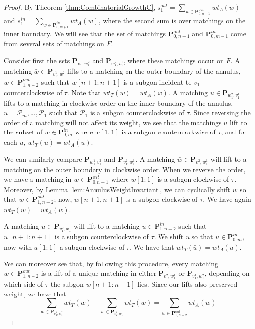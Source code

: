 \documentclass[12pt]{article}
\theoremstyle{remark}
\newcommand*{\pathset}[2]{\mathbf{P}_{#1,#2}}
\newcommand*{\poly}[1]{\mathcal{P}_{#1}}
\begin{document}
\begin{proof}
By Theorem \ref{thm:CombinatorialGrowthC}, $s_1^{out} = \sum_{w \in \pathset{0}{n+1}^{out}} wt_A(w)$ and $s_1^{in} = \sum_{w \in \pathset{0}{m+1}^{in}} wt_A(w)$, where the second sum is over matchings on the inner boundary. 
We will see that the set of matchings $\pathset{0}{n+1}^{out}$ and $\pathset{0}{m+1}^{in}$  come from several sets of matchings on $F$.

Consider first the sets $\pathset{v_1^1}{w_1^2}$ and $\pathset{w_1^2}{v_1^1}$, where these matchings occur on $F$. A matching $\bar{w} \in \pathset{v_1^1}{w_1^2}$ lifts to a matching on the outer boundary of the annulus, $w \in \pathset{1}{n+2}^{out}$ such that $w[n+1:n+1]$ is a subgon incident to $v_1$ counterclockwise of $\tau$. Note that $wt_T(\bar{w}) = wt_A(w)$. 
A matching $\bar{u} \in \pathset{w_1^2}{v_1^1}$ lifts to a matching in clockwise order on the inner boundary of the annulus, $u = \poly{m},\ldots,\poly{1}$ such that $\poly{1}$ is a subgon counterclockwise of $\tau$. Since reversing the order of a matching will not affect its weight, we see that the matchings $\bar{u}$ lift to the subset of $w \in \pathset{0}{m}^{in}$ where $w[1:1]$ is a subgon counterclockwise of $\tau$, and for each $\bar{u}$, $wt_T(\bar{u}) = wt_A(u)$. 

We can similarly compare $\pathset{w_1^1}{v_1^2}$ and $\pathset{v_1^2}{w_1^1}$. A matching $\bar{w} \in \pathset{v_1^2}{w_1^1}$ will lift to a matching on the outer boundary in clockwise order. When we reverse the order, we have a matching in $w \in \pathset{0}{n+1}^{out}$ where $w[1:1]$ is a subgon clockwise of $\tau$. Moreover, by Lemma \ref{lem:AnnulusWeightInvariant}, we can cyclically shift $w$ so that $w \in \pathset{1}{n+2}^{out}$; now, $w[n+1,n+1]$ is a subgon clockwise of $\tau$. We have again $wt_T(\bar{w}) = wt_A(w)$. 

A matching $\bar{u} \in \pathset{v_1^2}{w_1^1}$ will lift to a matching $u \in \pathset{1}{n+2}^{in}$ such that  $u[n+1:n+1]$ is a subgon counterclockwise of $\tau$. We shift $u$ so that $u \in \pathset{0}{m}^{in}$, now with $u[1:1]$ a subgon clockwise of $\tau$. We have that $wt_T(\bar{u}) = wt_A(u)$.

We can moreover see that, by following this procedure, every matching $w \in \pathset{1}{n+2}^{out}$ is a lift of a unique matching in either $\pathset{v_1^2}{w_1^1}$ or $\pathset{v_1^1}{w_1^2}$, depending on which side of $\tau$ the subgon $w[n+1:n+1]$ lies. Since our lifts also preserved weight, we have that \[
\sum_{w \in \pathset{v_1^1}{w_1^2}} wt_T(w) + \sum_{w \in \pathset{v_2^1}{w_1^1}} wt_T(w) = \sum_{w \in \pathset{1}{n+2}^{out}} wt_A(w)
\]


\end{proof}
\end{document}
